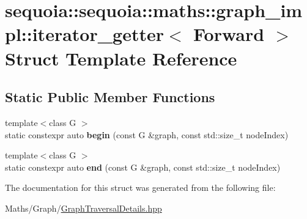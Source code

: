 \hypertarget{structsequoia_1_1sequoia_1_1maths_1_1graph__impl_1_1iterator__getter}{}\section{sequoia\+::sequoia\+::maths\+::graph\+\_\+impl\+::iterator\+\_\+getter$<$ Forward $>$ Struct Template Reference}
\label{structsequoia_1_1sequoia_1_1maths_1_1graph__impl_1_1iterator__getter}
\subsection*{Static Public Member Functions}
\begin{DoxyCompactItemize}
\item 
\mbox{\label{structsequoia_1_1sequoia_1_1maths_1_1graph__impl_1_1iterator__getter_ae381f16d045b5c84d39ccb0f289e0199}} 
{\footnotesize template$<$class G $>$ }\\static constexpr auto {\bfseries begin} (const G \&graph, const std\+::size\+\_\+t node\+Index)
\item 
\mbox{\label{structsequoia_1_1sequoia_1_1maths_1_1graph__impl_1_1iterator__getter_a5354f72af127e38054aed06d6f59ef18}} 
{\footnotesize template$<$class G $>$ }\\static constexpr auto {\bfseries end} (const G \&graph, const std\+::size\+\_\+t node\+Index)
\end{DoxyCompactItemize}


The documentation for this struct was generated from the following file\+:\begin{DoxyCompactItemize}
\item 
Maths/\+Graph/\mbox{\hyperlink{_graph_traversal_details_8hpp}{Graph\+Traversal\+Details.\+hpp}}\end{DoxyCompactItemize}
